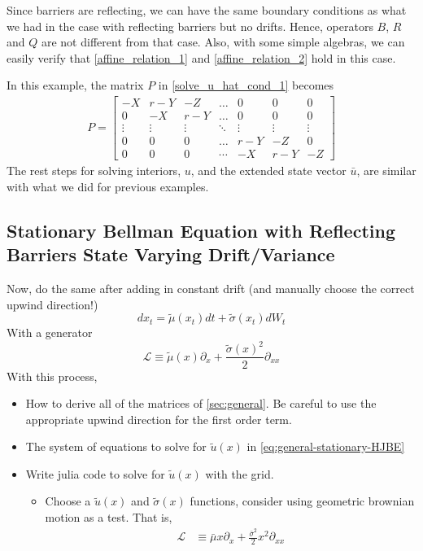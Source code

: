 \documentclass[11pt]{article}
\newcommand{\D}[1][]{\ensuremath{\partial_{#1}}}
\begin{document}
Since barriers are reflecting, we can have the same boundary conditions as what we had in the case with reflecting barriers but no drifts. Hence, operators $B$, $R$ and $Q$ are not different from that case. Also, with some simple algebras, we can easily verify that \eqref{affine_relation_1} and \eqref{affine_relation_2} hold in this case.

In this example, the matrix $P$ in \eqref{solve_u_hat_cond_1} becomes
\begin{align}
P = \begin{bmatrix}
-X&r-Y&-Z&\dots&0&0&0\\
0&-X&r-Y&\dots&0&0&0\\
\vdots&\vdots&\vdots&\ddots&\vdots&\vdots&\vdots\\
0&0&0&\dots&r-Y&-Z&0\\
0&0&0&\cdots&-X&r-Y&-Z
\end{bmatrix}
\end{align}
The rest steps for solving interiors, $u$, and the extended state vector $\bar{u}$, are similar with what we did for previous examples.


\subsection{Stationary Bellman Equation with Reflecting Barriers State Varying Drift/Variance}
Now, do the same after adding in constant drift (and manually choose the correct upwind direction!)
$$
d x_t = \tilde{\mu}(x_t) dt + \tilde{\sigma}(x_t) d W_t
$$
With a generator
$$
\mathcal{L} \equiv \tilde{\mu}(x) \D[x] + \frac{\tilde{\sigma}(x)^2}{2}\D[xx]
$$
With this process,
\begin{itemize}
	\item How to derive all of the matrices of \cref{sec:general}.  Be careful to use the appropriate upwind direction for the first order term.
	\item The system of equations to solve for $\tilde{u}(x)$ in \cref{eq:general-stationary-HJBE}
	\item Write julia code to solve for $\tilde{u}(x)$ with the grid.
	\begin{itemize}
		\item Choose a $\tilde{u}(x)$ and $\tilde{\sigma}(x)$ functions, consider using geometric brownian motion as a test.  That is,
		\begin{align}
			\mathcal{L} &\equiv \bar{\mu} x \D[x] + \frac{\bar{\sigma}^2}{2}x^2\D[xx]
		\end{align}
	\end{itemize}
\end{itemize}
\end{document}
